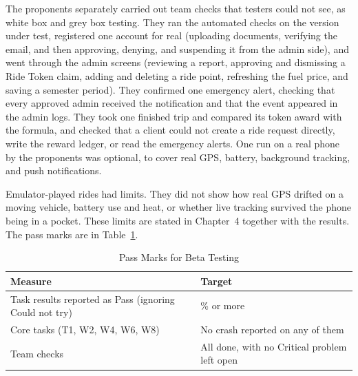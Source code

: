The proponents separately carried out team checks that testers could not see, as white box and grey box testing. They ran the automated checks on the version under test, registered one account for real (uploading documents, verifying the email, and then approving, denying, and suspending it from the admin side), and went through the admin screens (reviewing a report, approving and dismissing a Ride Token claim, adding and deleting a ride point, refreshing the fuel price, and saving a semester period). They confirmed one emergency alert, checking that every approved admin received the notification and that the event appeared in the admin logs. They took one finished trip and compared its token award with the formula, and checked that a client could not create a ride request directly, write the reward ledger, or read the emergency alerts. One run on a real phone by the proponents was optional, to cover real GPS, battery, background tracking, and push notifications.

Emulator-played rides had limits. They did not show how real GPS drifted on a moving vehicle, battery use and heat, or whether live tracking survived the phone being in a pocket. These limits are stated in Chapter~4 together with the results. The pass marks are in Table~\ref{tab:betapass}.

\begin{table}[htbp]
    \centering
    \caption{Pass Marks for Beta Testing}
    \label{tab:betapass}
    \small
    \renewcommand{\arraystretch}{1.2}
    \begin{tabular}{|>{\raggedright\arraybackslash}p{}|>{\raggedright\arraybackslash}p{}|}
        \hline
        \textbf{Measure} & \textbf{Target} \\
        \hline
        Task results reported as Pass (ignoring Could not try) & 80\% or more \\
        Core tasks (T1, W2, W4, W6, W8) & No crash reported on any of them \\
        Team checks & All done, with no Critical problem left open \\
        \hline
    \end{tabular}
\end{table}

